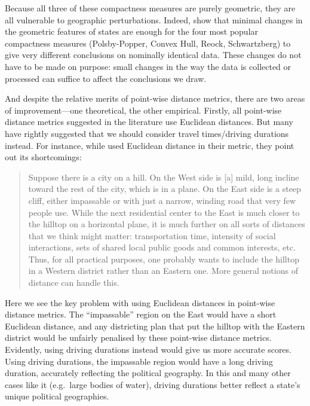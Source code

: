 \documentclass[]{article}
\begin{document}
Because all three of these compactness measures are purely geometric,
they are all vulnerable to geographic perturbations. Indeed, \cite{bswp}
show that minimal changes in the geometric features of states are enough
for the four most popular compactness measures (Polsby-Popper, Convex
Hull, Reock, Schwartzberg) to give very different conclusions on
nominally identical data. These changes do not have to be made on
purpose: small changes in the way the data is collected or processed can
suffice to affect the conclusions we draw.

And despite the relative merits of point-wise distance metrics, there
are two areas of improvement---one theoretical, the other empirical.
Firstly, all point-wise distance metrics suggested in the literature use
Euclidean distances. But many have rightly suggested that we should
consider travel times/driving durations instead. For instance, while
\cite{fh2011} used Euclidean distance in their metric, they point out
its shortcomings:

\begin{quote}
Suppose there is a city on a hill. On the West side is {[}a{]} mild,
long incline toward the rest of the city, which is in a plane. On the
East side is a steep cliff, either impassable or with just a narrow,
winding road that very few people use. While the next residential center
to the East is much closer to the hilltop on a horizontal plane, it is
much further on all sorts of distances that we think might matter:
transportation time, intensity of social interactions, sets of shared
local public goods and common interests, etc. Thus, for all practical
purposes, one probably wants to include the hilltop in a Western
district rather than an Eastern one. More general notions of distance
can handle this.
\end{quote}

Here we see the key problem with using Euclidean distances in point-wise
distance metrics. The ``impassable'' region on the East would have a
short Euclidean distance, and any districting plan that put the hilltop
with the Eastern district would be unfairly penalised by these
point-wise distance metrics. Evidently, using driving durations instead
would give us more accurate scores. Using driving durations, the
impassable region would have a long driving duration, accurately
reflecting the political geography. In this and many other cases like it
(e.g.~large bodies of water), driving durations better reflect a state's
unique political geographies.
\end{document}
